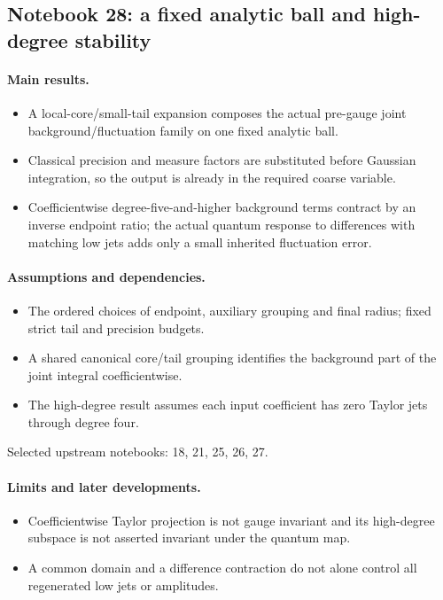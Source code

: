 \documentclass[11pt]{article}
\theoremstyle{remark}
\begin{document}
\subsection{Notebook 28: a fixed analytic ball and high-degree stability}
\label{hnc-28}
\noindent{}\par

\paragraph{Main results.}
\begin{itemize}
\item A local-core/small-tail expansion composes the actual pre-gauge joint background/fluctuation family on one fixed analytic ball.
\item Classical precision and measure factors are substituted before Gaussian integration, so the output is already in the required coarse variable.
\item Coefficientwise degree-five-and-higher background terms contract by an inverse endpoint ratio; the actual quantum response to differences with matching low jets adds only a small inherited fluctuation error.
\end{itemize}

\paragraph{Assumptions and dependencies.}
\begin{itemize}
\item The ordered choices of endpoint, auxiliary grouping and final radius; fixed strict tail and precision budgets.
\item A shared canonical core/tail grouping identifies the background part of the joint integral coefficientwise.
\item The high-degree result assumes each input coefficient has zero Taylor jets through degree four.
\end{itemize}

Selected upstream notebooks: 18, 21, 25, 26, 27.\par

\paragraph{Limits and later developments.}
\begin{itemize}
\item Coefficientwise Taylor projection is not gauge invariant and its high-degree subspace is not asserted invariant under the quantum map.
\item A common domain and a difference contraction do not alone control all regenerated low jets or amplitudes.
\end{itemize}
\end{document}
